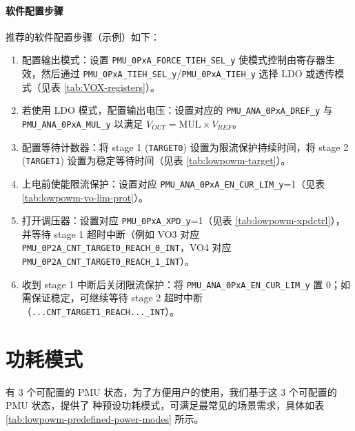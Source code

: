\documentclass[main\_\_CN.tex]{subfiles}
\begin{document}
\begin{itemize}
    \paragraph{软件配置步骤}

推荐的软件配置步骤（示例）如下：

    \begin{enumerate}
    \item 配置输出模式：设置 \texttt{PMU\_0PxA\_FORCE\_TIEH\_SEL\_y} 使模式控制由寄存器生效，然后通过 \texttt{PMU\_0PxA\_TIEH\_SEL\_y}/\texttt{PMU\_0PxA\_TIEH\_y} 选择 LDO 或透传模式（见表 \ref{tab:VOX-registers}）。
    \item 若使用 LDO 模式，配置输出电压：设置对应的 \texttt{PMU\_ANA\_0PxA\_DREF\_y} 与 \texttt{PMU\_ANA\_0PxA\_MUL\_y} 以满足 \(V_{OUT}=\mathrm{MUL}\times V_{REF}\)。
    \item 配置等待计数器：将 stage 1 (\texttt{TARGET0}) 设置为限流保护持续时间，将 stage 2 (\texttt{TARGET1}) 设置为稳定等待时间（见表 \ref{tab:lowpowm-target}）。
    \item 上电前使能限流保护：设置对应 \texttt{PMU\_ANA\_0PxA\_EN\_CUR\_LIM\_y}=1（见表 \ref{tab:lowpowm-vo-lim-prot}）。
    \item 打开调压器：设置对应 \texttt{PMU\_0PxA\_XPD\_y}=1（见表 \ref{tab:lowpowm-xpdctrl}），并等待 stage 1 超时中断（例如 VO3 对应 \texttt{PMU\_0P2A\_CNT\_TARGET0\_REACH\_0\_INT}，VO4 对应 \texttt{PMU\_0P2A\_CNT\_TARGET0\_REACH\_1\_INT}）。
    \item 收到 stage 1 中断后关闭限流保护：将 \texttt{PMU\_ANA\_0PxA\_EN\_CUR\_LIM\_y} 置 0；如需保证稳定，可继续等待 stage 2 超时中断（\texttt{...CNT\_TARGET1\_REACH...\_INT}）。
    \end{enumerate}

\end{itemize}

\section{功耗模式}

\chipname{} 有 3 个可配置的 PMU 状态，为了方便用户的使用，我们基于这 3 个可配置的 PMU 状态，提供了  种预设功耗模式，可满足最常见的场景需求，具体如表 \ref{tab:lowpowm-predefined-power-modes} 所示。
\end{document}
